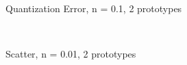 \documentclass[10pt,a4paper]{article}
\begin{document}
\begin{figure}
  \centering
{} \\
  \caption{Quantization Error, n = 0.1, 2 prototypes}
  \label{fig:n01_k2_learning}
\end{figure}

\begin{figure}
  \centering
{} \\
  \caption{Scatter, n = 0.01, 2 prototypes}
  \label{fig:gull}
\end{figure}
\end{document}
